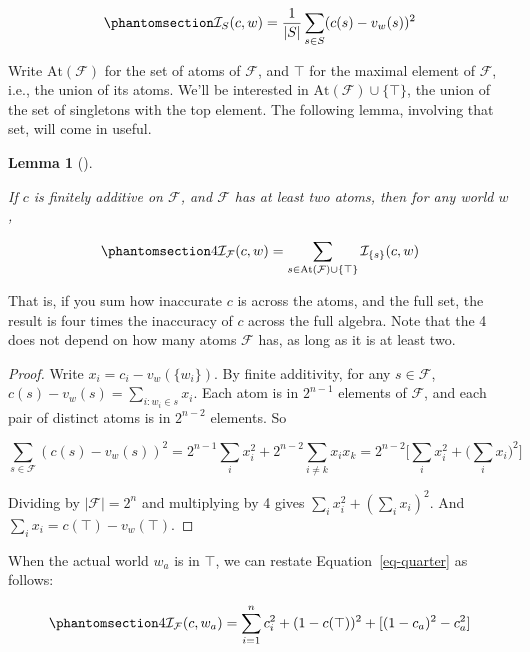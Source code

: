 \documentclass[
  11pt,
  letterpaper,
  DIV=11,
  numbers=noendperiod,
  twoside]{scrartcl}
\theoremstyle{definition}
\theoremstyle{plain}
\newtheorem{lemma}{Lemma}[section]
\theoremstyle{plain}
\theoremstyle{remark}
\begin{document}
\begin{equation}\protect\phantomsection\label{eq-brier}{
\mathcal{I}_S(c, w) = \frac{1}{|S|}\sum_{s \in S}(c(s) - v_w(s))^2
}\end{equation}

Write \(\mathrm{At}(\mathcal{F})\) for the set of atoms of
\(\mathcal{F}\), and \(\top\) for the maximal element of
\(\mathcal{F}\), i.e., the union of its atoms. We'll be interested in
\(\mathrm{At}(\mathcal{F}) \cup \{\top\}\), the union of the set of
singletons with the top element. The following lemma, involving that
set, will come in useful.

\begin{lemma}[]\protect\hypertarget{lem-quarter}{}\label{lem-quarter}

If \(c\) is finitely additive on \(\mathcal{F}\), and \(\mathcal{F}\)
has at least two atoms, then for any world \(w\),

\begin{equation}\protect\phantomsection\label{eq-quarter}{
4\mathcal{I}_{\mathcal{F}}(c, w) = \sum_{s \in \mathrm{At}(\mathcal{F}) \cup \{\top\}}\mathcal{I}_{\{s\}}(c, w)
}\end{equation}

\end{lemma}

That is, if you sum how inaccurate \(c\) is across the atoms, and the
full set, the result is four times the inaccuracy of \(c\) across the
full algebra. Note that the 4 does not depend on how many atoms
\(\mathcal{F}\) has, as long as it is at least two.

\begin{proof}
Write \(x_i = c_i - v_w(\{w_i\})\). By finite additivity, for any
\(s \in \mathcal{F}\), \(c(s) - v_w(s) = \sum_{i : w_i \in s} x_i\).
Each atom is in \(2^{n-1}\) elements of \(\mathcal{F}\), and each pair
of distinct atoms is in \(2^{n-2}\) elements. So

\[
\sum_{s \in \mathcal{F}} (c(s) - v_w(s))^2 = 2^{n-1}\sum_i x_i^2 + 2^{n-2}\sum_{i \neq k} x_i x_k = 2^{n-2}\Big[\sum_i x_i^2 + \Big(\sum_i x_i\Big)^2\Big]
\]

Dividing by \(|\mathcal{F}| = 2^n\) and multiplying by 4 gives
\(\sum_i x_i^2 + (\sum_i x_i)^2\). And
\(\sum_i x_i = c(\top) - v_w(\top)\).
\end{proof}

When the actual world \(w_a\) is in \(\top\), we can restate
Equation~\ref{eq-quarter} as follows:

\begin{equation}\protect\phantomsection\label{eq-restate}{
4\mathcal{I}_{\mathcal{F}}(c, w_a) = \sum_{i=1}^{n}c_i^2 + (1-c(\top))^2 + [(1 - c_a)^2 - c_a^2]
}\end{equation}
\end{document}
